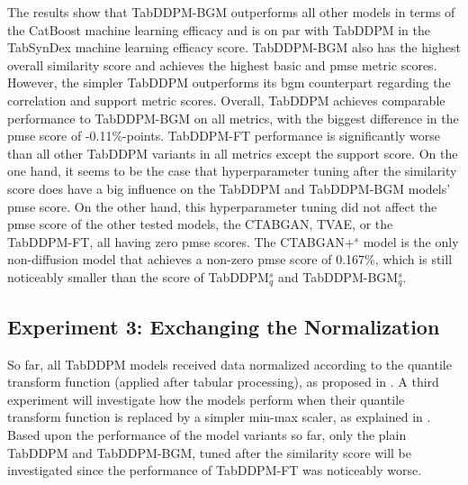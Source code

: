 The results show that TabDDPM-BGM outperforms all other models in terms of the CatBoost machine learning efficacy and is on par with TabDDPM in the TabSynDex machine learning efficacy score.
TabDDPM-BGM also has the highest overall similarity score and achieves the highest basic and \gls{pmse} metric scores.
However, the simpler TabDDPM outperforms its \gls{bgm} counterpart regarding the correlation and support metric scores.
Overall, TabDDPM achieves comparable performance to TabDDPM-BGM on all metrics, with the biggest difference in the \gls{pmse} score of -0.11\%-points.
TabDDPM-FT performance is significantly worse than all other TabDDPM variants in all metrics except the support score.
On the one hand, it seems to be the case that hyperparameter tuning after the similarity score does have a big influence on the TabDDPM and TabDDPM-BGM models' \gls{pmse} score.
On the other hand, this hyperparameter tuning did not affect the \gls{pmse} score of the other tested models, the CTABGAN, TVAE, or the TabDDPM-FT, all having zero \gls{pmse} scores.
The CTABGAN+$^{s}$ \gls{model} is the only non-diffusion \gls{model} that achieves a non-zero \gls{pmse} score of 0.167\%, which is still noticeably smaller than the score of TabDDPM$^{s}_{q}$ and TabDDPM-BGM$^{s}_{q}$.
\newpage
\subsection{Experiment 3: Exchanging the Normalization}
\label{ch:Experiment-3}

So far, all TabDDPM models received data normalized according to the quantile transform function (applied after tabular processing), as proposed in \cite{kotelnikov2022TabDDPMModellingTabular}.
A third experiment will investigate how the models perform when their quantile transform function is replaced by a simpler min-max scaler, as explained in .
Based upon the performance of the \gls{model} variants so far, only the plain TabDDPM and TabDDPM-BGM, tuned after the similarity score will be investigated since the performance of
TabDDPM-FT was noticeably worse.

